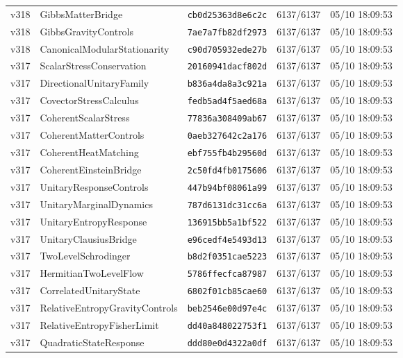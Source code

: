 \documentclass[11pt]{article}
\theoremstyle{definition}\newtheorem{deriv}{Derivation}
\begin{document}
{\begin{longtable}{@{}lllll@{}}
v318 & GibbsMatterBridge & \texttt{cb0d25363d8e6c2c} & 6137/6137 & 05/10 18:09:53 \\
v318 & GibbsGravityControls & \texttt{7ae7a7fb82df2973} & 6137/6137 & 05/10 18:09:53 \\
v318 & CanonicalModularStationarity & \texttt{c90d705932ede27b} & 6137/6137 & 05/10 18:09:53 \\
v317 & ScalarStressConservation & \texttt{20160941dacf802d} & 6137/6137 & 05/10 18:09:53 \\
v317 & DirectionalUnitaryFamily & \texttt{b836a4da8a3c921a} & 6137/6137 & 05/10 18:09:53 \\
v317 & CovectorStressCalculus & \texttt{fedb5ad4f5aed68a} & 6137/6137 & 05/10 18:09:53 \\
v317 & CoherentScalarStress & \texttt{77836a308409ab67} & 6137/6137 & 05/10 18:09:53 \\
v317 & CoherentMatterControls & \texttt{0aeb327642c2a176} & 6137/6137 & 05/10 18:09:53 \\
v317 & CoherentHeatMatching & \texttt{ebf755fb4b29560d} & 6137/6137 & 05/10 18:09:53 \\
v317 & CoherentEinsteinBridge & \texttt{2c50fd4fb0175606} & 6137/6137 & 05/10 18:09:53 \\
v317 & UnitaryResponseControls & \texttt{447b94bf08061a99} & 6137/6137 & 05/10 18:09:53 \\
v317 & UnitaryMarginalDynamics & \texttt{787d6131dc31cc6a} & 6137/6137 & 05/10 18:09:53 \\
v317 & UnitaryEntropyResponse & \texttt{136915bb5a1bf522} & 6137/6137 & 05/10 18:09:53 \\
v317 & UnitaryClausiusBridge & \texttt{e96cedf4e5493d13} & 6137/6137 & 05/10 18:09:53 \\
v317 & TwoLevelSchrodinger & \texttt{b8d2f0351cae5223} & 6137/6137 & 05/10 18:09:53 \\
v317 & HermitianTwoLevelFlow & \texttt{5786ffecfca87987} & 6137/6137 & 05/10 18:09:53 \\
v317 & CorrelatedUnitaryState & \texttt{6802f01cb85cae60} & 6137/6137 & 05/10 18:09:53 \\
v317 & RelativeEntropyGravityControls & \texttt{beb2546e00d97e4c} & 6137/6137 & 05/10 18:09:53 \\
v317 & RelativeEntropyFisherLimit & \texttt{dd40a848022753f1} & 6137/6137 & 05/10 18:09:53 \\
v317 & QuadraticStateResponse & \texttt{ddd80e0d4322a0df} & 6137/6137 & 05/10 18:09:53 \\

\end{longtable}}
\end{document}
